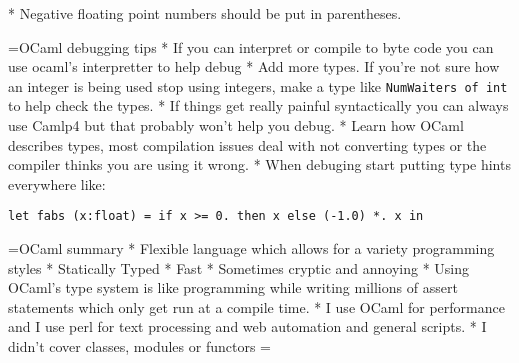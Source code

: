 \documentclass[titlepage,usenames,a4,landscape,semhelv]{seminar}
\begin{document}
\begin{slide}
* Negative floating point numbers should be put in parentheses.

=OCaml debugging tips
* If you can interpret or compile to byte code you can use ocaml's interpretter to help debug
* Add more types. If you're not sure how an integer is being used stop using integers, make a type like \texttt{NumWaiters of int} to help check the types.
* If things get really painful syntactically you can always use Camlp4 but that probably won't help you debug.
* Learn how OCaml describes types, most compilation issues deal with not converting types or the compiler thinks you are using it wrong.
* When debuging start putting type hints everywhere like:
\begin{verbatim}
let fabs (x:float) = if x >= 0. then x else (-1.0) *. x in
\end{verbatim}


=OCaml summary
* Flexible language which allows for a variety programming styles
* Statically Typed
* Fast
* Sometimes cryptic and annoying
* Using OCaml's type system is like programming while writing millions of assert statements which only get run at a compile time.
* I use OCaml for performance and I use perl for text processing and web automation and general scripts.
* I didn't cover classes, modules or functors
=


\end{slide}
\end{document}
